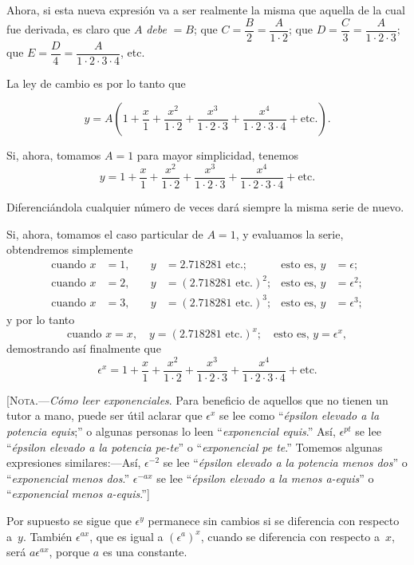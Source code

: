 \documentclass[12pt]{book}[2005/09/16]
\newcommand{\DPPageSep}[2]{\Pagelabel{#2}}
\newcommand{\Pagelabel}[1]
  {\phantomsection\label{#1}}
\newcommand{\Strut}{\rule{0pt}{16pt}}
\begin{document}
Ahora, si esta nueva expresión va a ser realmente la misma
que aquella de la cual fue derivada, es claro que
$A$ \emph{debe} $=B$; que $C=\dfrac{B}{2}=\dfrac{A}{1· 2}$; que $D = \dfrac{C}{3} = \dfrac{A}{1 · 2 · 3}$;
que $E = \dfrac{D}{4} = \dfrac{A}{1 · 2 · 3 · 4}$, etc.

La ley de cambio es por lo tanto que\Strut
\[
y = A\left(1 + \dfrac{x}{1} + \dfrac{x^2}{1 · 2} + \dfrac{x^3}{1 · 2 · 3} + \dfrac{x^4}{1 · 2 · 3 · 4} + \text{etc}.\right).
\]

Si, ahora, tomamos $A = 1$ para mayor
simplicidad, tenemos
\[
y = 1 + \dfrac{x}{1} + \dfrac{x^2}{1 · 2} + \dfrac{x^3}{1 · 2 · 3} + \dfrac{x^4}{1 · 2 · 3 · 4} + \text{etc}.
\]

Diferenciándola cualquier número de veces dará
siempre la misma serie de nuevo.

Si, ahora, tomamos el caso particular de $A=1$, y
evaluamos la serie, obtendremos simplemente
\begin{align*}
\text{cuando } x &= 1,\quad & y &= 2.718281 \text{ etc.};    & \text{esto es, } y &= \epsilon;   \\
\text{cuando } x &= 2,\quad & y &=(2.718281 \text{ etc.})^2; & \text{esto es, } y &= \epsilon^2; \\
\text{cuando } x &= 3,\quad & y &=(2.718281 \text{ etc.})^3; & \text{esto es, } y &= \epsilon^3;
\end{align*}
\DPPageSep{157.png}{145}%
y por lo tanto
\[
\text{cuando } x=x,\quad y=(2.718281 \text{ etc}.)^x;\quad\text{esto es, } y=\epsilon^x,
\]
demostrando así finalmente que
\[
\epsilon^x = 1 + \dfrac{x}{1} + \dfrac{x^2}{1·2} + \dfrac{x^3}{1· 2· 3} + \dfrac{x^4}{1· 2· 3· 4} + \text{etc}.
\]

[\textsc{Nota}.---\textit{Cómo leer exponenciales}. Para beneficio
de aquellos que no tienen un tutor a mano, puede ser útil
aclarar que $\epsilon^x$ se lee como ``\emph{épsilon elevado a la potencia equis};''
o algunas personas lo leen ``\emph{exponencial equis}.'' Así, $\epsilon^{pt}$ se
lee ``\emph{épsilon elevado a la potencia pe-te}'' o ``\emph{exponencial
pe te}.'' Tomemos algunas expresiones similares:---Así, $\epsilon^{-2}$ se
lee ``\emph{épsilon elevado a la potencia menos dos}'' o ``\emph{exponencial
menos dos}.'' $\epsilon^{-ax}$ se lee ``\emph{épsilon elevado a la menos
a-equis}'' o ``\emph{exponencial menos a-equis}.'']

Por supuesto se sigue que $\epsilon^y$ permanece sin cambios si se
diferencia con respecto a~$y$. También $\epsilon^{ax}$, que es
igual a $(\epsilon^a)^x$, cuando se diferencia con respecto
a~$x$, será $a\epsilon^{ax}$, porque $a$ es una constante.
\end{document}
